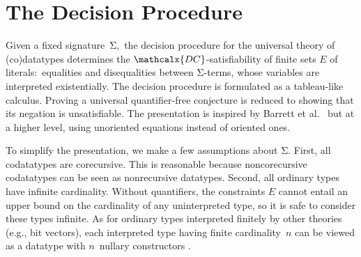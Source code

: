 \documentclass[smallcondensed,draft]{svjour3}
\newcommand\Sig{\mathrm{\Sigma}}
\newcommand{\Ec}{E}
\newcommand{\thD}{\mathcalx{DC}}
\newcommand\Types{\mathcalx{Y}}
\newcommand\Codata{\Types_{\mathrm{codt}}}
\begin{document}

\section{The Decision Procedure} %
\label{sec:the-decision-procedure}

Given a fixed signature~$\Sig,$
the decision procedure for the universal theory of (co)data\-types %
determines the
$\thD$-satisfiability of finite sets $\Ec$ of literals:\ equalities
and disequalities between $\Sig$-terms,
whose variables are interpreted existentially.
The decision procedure is formulated as a tableau-like calculus.
Proving a universal quantifier-free conjecture is reduced to showing that
its negation is unsatisfiable. The presentation is
inspired by Barrett et al.\ \cite{barrett-et-al-2007} but at
a higher level, using unoriented equations instead of oriented ones.

To simplify the presentation, we make a few assumptions about
$\Sig.$
First, all codatatypes %
are corecursive. This is reasonable
because noncorecursive codatatypes can be seen as nonrecursive
datatypes.
Second, all ordinary types have infinite cardinality.
Without quantifiers, the constraints $\Ec$ cannot entail an upper
bound on the cardinality of any uninterpreted type, so it is safe to consider these types
infinite. As for ordinary types interpreted finitely by other theories (e.g.,
bit vectors), each interpreted type having finite cardinality~$n$
can be viewed as a %
datatype with $n$~nullary constructors
\cite{barrett-et-al-2007}.

\end{document}
